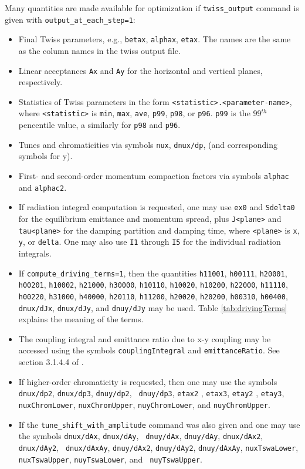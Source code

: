 \documentclass[11pt]{article}
\begin{document}
\begin{itemize}
Many quantities are made available for optimization if \verb|twiss_output| command is given
with \verb|output_at_each_step=1|:
\begin{itemize} 
\item Final Twiss parameters, e.g., \verb|betax|, \verb|alphax|, \verb|etax|.  The names
are the same as the column names in the twiss output file.
\item Linear acceptances \verb|Ax| and \verb|Ay| for the horizontal and vertical planes, respectively.
\item Statistics of Twiss parameters in the form \verb|<statistic>.<parameter-name>|,
where \verb|<statistic>| is \verb|min|, \verb|max|, \verb|ave|, \verb|p99|, \verb|p98|, or
\verb|p96|.  \verb|p99| is the 99$^{th}$ pencentile value, a similarly for \verb|p98| and \verb|p96|.
\item Tunes and chromaticities via symbols \verb|nux|, \verb|dnux/dp|, (and corresponding
symbols for y).
\item First- and second-order momentum compaction factors via symbols \verb|alphac| and \verb|alphac2|.  
\item If radiation integral computation is requested,  one may use \verb|ex0| and \verb|Sdelta0| for
the equilibrium emittance and momentum spread, plus \verb|J<plane>|
and \verb|tau<plane>| for the damping partition and damping time,
where \verb|<plane>| is \verb|x|, \verb|y|, or \verb|delta|.  One may also use
\verb|I1| through \verb|I5| for the individual radiation integrals.
\item If \verb|compute_driving_terms=1|, then the quantities
{\tt h11001}, {\tt h00111}, {\tt h20001}, {\tt h00201}, {\tt h10002}, {\tt h21000}, {\tt h30000}, {\tt h10110}, {\tt h10020},
{\tt h10200}, {\tt h22000}, {\tt h11110}, {\tt h00220}, {\tt h31000}, {\tt h40000}, {\tt h20110}, {\tt h11200}, {\tt h20020},
{\tt h20200}, {\tt h00310}, {\tt h00400}, {\tt dnux/dJx}, {\tt dnux/dJy},  and {\tt dnuy/dJy} 
may be used.  Table \ref{tab:drivingTerms} explains the meaning of the terms.
\item The coupling integral and emittance ratio due to x-y coupling may
be accessed using the symbols \verb|couplingIntegral| and
\verb|emittanceRatio|.  See section 3.1.4.4 of \cite{HAPE}.
\item If higher-order chromaticity is requested, then one may use the
  symbols {\tt dnux/dp2}, {\tt dnux/dp3}, {\tt dnuy/dp2}, {\tt
    dnuy/dp3}, {\tt etax2} , {\tt etax3}, {\tt etay2} , {\tt etay3},
  {\tt nuxChromLower}, {\tt nuxChromUpper}, {\tt nuyChromLower}, and
  {\tt nuyChromUpper}.
\item If the \verb|tune_shift_with_amplitude| command was also given
  and one may use the symbols {\tt dnux/dAx}, {\tt dnux/dAy}, {\tt
    dnuy/dAx}, {\tt dnuy/dAy}, {\tt dnux/dAx2}, {\tt dnux/dAy2}, {\tt
    dnux/dAxAy}, {\tt dnuy/dAx2}, {\tt dnuy/dAy2}, {\tt dnuy/dAxAy},
  {\tt nuxTswaLower}, {\tt nuxTswaUpper}, {\tt nuyTswaLower}, and {\tt
    nuyTswaUpper}.


\end{itemize}
\end{itemize}
\end{document}
